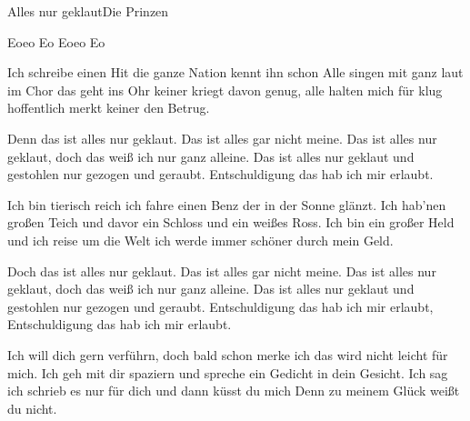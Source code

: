 \begin{song}{Alles nur geklaut}{Die Prinzen}{}

 Eoeo   Eo   Eoeo   Eo

Ich schreibe einen Hit die ganze Nation kennt ihn schon
 Alle singen mit ganz laut im Chor das geht ins Ohr
keiner kriegt davon genug, alle halten mich für klug
hoffentlich merkt keiner den Betrug.

Denn das ist alles nur geklaut. Das ist alles gar nicht meine.
Das ist alles nur geklaut, doch das weiß ich nur ganz alleine.
Das ist alles nur geklaut und gestohlen nur gezogen  und geraubt.
Entschuldigung das hab ich mir erlaubt.

Ich bin tierisch reich ich fahre einen Benz der in der Sonne glänzt.
 Ich hab'nen großen Teich und davor ein Schloss und ein weißes Ross.
Ich bin ein großer Held und ich reise um die Welt
ich werde immer schöner durch mein Geld.

Doch das ist alles nur geklaut. Das ist alles gar nicht meine.
Das ist alles nur geklaut, doch das weiß ich nur ganz alleine.
Das ist alles nur geklaut und gestohlen nur gezogen  und geraubt.
Entschuldigung das hab ich mir erlaubt, Entschuldigung das hab ich mir erlaubt.

Ich will dich gern verführn, doch bald schon merke ich 
das wird nicht leicht für mich.
 Ich geh mit dir spaziern und spreche ein Gedicht in dein Gesicht.
Ich sag ich schrieb es nur für dich  und dann küsst du mich
Denn zu meinem Glück weißt du nicht.


\end{song}
